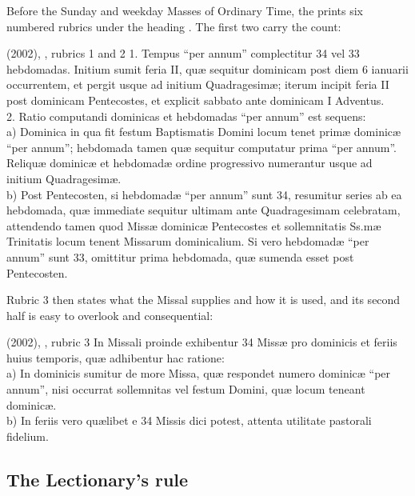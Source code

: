 Before the Sunday and weekday Masses of Ordinary Time, the  prints six
numbered rubrics under the heading . The first two carry the count:

\begin{normtext}{ (2002), , rubrics 1 and 2}
1. Tempus ``per annum'' complectitur 34 vel 33 hebdomadas. Initium sumit feria II, quæ sequitur
dominicam post diem 6 ianuarii occurrentem, et pergit usque ad initium Quadragesimæ; iterum incipit
feria II post dominicam Pentecostes, et explicit sabbato ante dominicam I Adventus.\\
2. Ratio computandi dominicas et hebdomadas ``per annum'' est sequens:\\
a) Dominica in qua fit festum Baptismatis Domini locum tenet primæ dominicæ ``per annum'';
hebdomada tamen quæ sequitur computatur prima ``per annum''. Reliquæ dominicæ et hebdomadæ ordine
progressivo numerantur usque ad initium Quadragesimæ.\\
b) Post Pentecosten, si hebdomadæ ``per annum'' sunt 34, resumitur series ab ea hebdomada, quæ
immediate sequitur ultimam ante Quadragesimam celebratam, attendendo tamen quod Missæ dominicæ
Pentecostes et sollemnitatis Ss.mæ Trinitatis locum tenent Missarum dominicalium. Si vero hebdomadæ
``per annum'' sunt 33, omittitur prima hebdomada, quæ sumenda esset post Pentecosten.
\end{normtext}

Rubric 3 then states what the Missal supplies and how it is used, and its second half is easy to
overlook and consequential:

\begin{normtext}{ (2002), , rubric 3}
In Missali proinde exhibentur 34 Missæ pro dominicis et feriis huius temporis, quæ adhibentur hac
ratione:\\
a) In dominicis sumitur de more Missa, quæ respondet numero dominicæ ``per annum'', nisi occurrat
sollemnitas vel festum Domini, quæ locum teneant dominicæ.\\
b) In feriis vero quælibet e 34 Missis dici potest, attenta utilitate pastorali fidelium.
\end{normtext}

\subsection{The Lectionary's rule}

